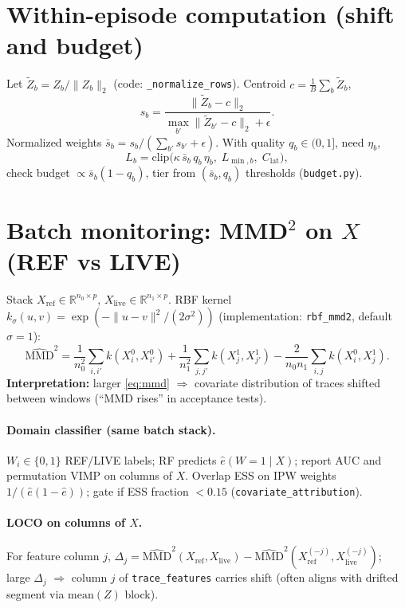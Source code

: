\documentclass[11pt]{article}
\begin{document}
\section{Within-episode computation (shift and budget)}
Let $\tilde{Z}_b = Z_b/\|Z_b\|_2$ (code: \texttt{\_normalize\_rows}). Centroid $c=\frac{1}{B}\sum_b \tilde{Z}_b$,
\begin{equation}
\label{eq:shift}
s_b = \frac{\|\tilde{Z}_b - c\|_2}{\max_{b'} \|\tilde{Z}_{b'} - c\|_2 + \epsilon}.
\end{equation}
Normalized weights $\bar{s}_b = s_b/(\sum_{b'} s_{b'} + \epsilon)$. With quality $q_b\in(0,1]$, need $\eta_b$,
\begin{equation}
\label{eq:budget}
L_b = \mathrm{clip}\big(\kappa\,\bar{s}_b\, q_b\, \eta_b,\; L_{\min,b},\; C_{\mathrm{lat}}\big),
\end{equation}
check budget $\propto \bar{s}_b(1-q_b)$, tier from $(\bar{s}_b, q_b)$ thresholds (\texttt{budget.py}).

\section{Batch monitoring: MMD$^2$ on $X$ (REF vs LIVE)}
Stack $X_{\mathrm{ref}}\in\mathbb{R}^{n_0\times p}$, $X_{\mathrm{live}}\in\mathbb{R}^{n_1\times p}$. RBF kernel $k_\sigma(u,v)=\exp(-\|u-v\|^2/(2\sigma^2))$ (implementation: \texttt{rbf\_mmd2}, default $\sigma=1$):
\begin{equation}
\label{eq:mmd}
\widehat{\mathrm{MMD}}^2
= \frac{1}{n_0^2}\sum_{i,i'} k(X^0_i,X^0_{i'})
+ \frac{1}{n_1^2}\sum_{j,j'} k(X^1_j,X^1_{j'})
- \frac{2}{n_0 n_1}\sum_{i,j} k(X^0_i,X^1_j).
\end{equation}
\textbf{Interpretation:} larger \eqref{eq:mmd} $\Rightarrow$ covariate distribution of traces shifted between windows (``MMD rises'' in acceptance tests).

\paragraph{Domain classifier (same batch stack).}
$W_i\in\{0,1\}$ REF/LIVE labels; RF predicts $\hat{e}(W=1\mid X)$; report AUC and permutation VIMP on columns of $X$.
Overlap ESS on IPW weights $1/(\hat{e}(1-\hat{e}))$; gate if ESS fraction $<0.15$ (\texttt{covariate\_attribution}).

\paragraph{LOCO on columns of $X$.}
For feature column $j$, $\Delta_j = \widehat{\mathrm{MMD}}^2(X_{\mathrm{ref}}, X_{\mathrm{live}}) - \widehat{\mathrm{MMD}}^2(X_{\mathrm{ref}}^{(-j)}, X_{\mathrm{live}}^{(-j)})$; large $\Delta_j$ $\Rightarrow$ column $j$ of \texttt{trace\_features} carries shift (often aligns with drifted segment via $\mathrm{mean}(Z)$ block).
\end{document}
